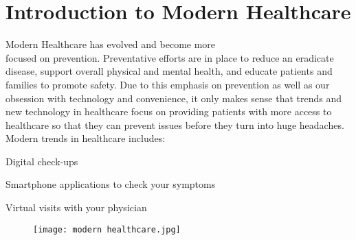 \documentclass[12pt,a4paper]{article}
\begin{document}
\clearpage
\tableofcontents
\clearpage


\section{Introduction to Modern Healthcare}
{\large Modern Healthcare has evolved and become more\\ focused on prevention. Preventative efforts are in place to reduce an eradicate disease, support overall physical and mental health, and educate patients and families to promote safety. Due to this emphasis on prevention as well as our obsession with technology and convenience, it only makes sense that trends and new technology in healthcare focus on providing patients with more access to healthcare so that they can prevent issues before they turn into huge headaches. Modern trends in healthcare includes:}

\begin{itemize}
{\large \item Digital check-ups
\item Smartphone applications to check your symptoms
\item Virtual visits with your physician}
\end{itemize}


\begin{figure}[h]
\centering
\texttt{[image: modern healthcare.jpg]}
\end{figure}



\clearpage
\end{document}
